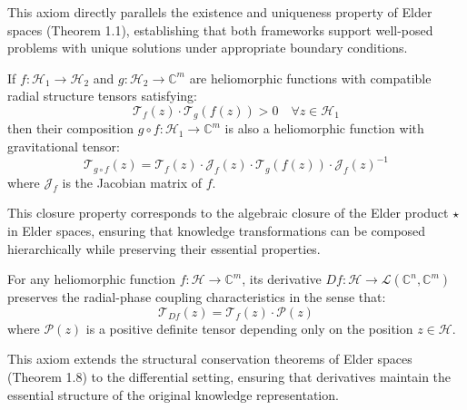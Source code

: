 \begin{remark}
This axiom directly parallels the existence and uniqueness property of Elder spaces (Theorem 1.1), establishing that both frameworks support well-posed problems with unique solutions under appropriate boundary conditions.
\end{remark}

\begin{axiom}
If $f: \mathcal{H}_1 \rightarrow \mathcal{H}_2$ and $g: \mathcal{H}_2 \rightarrow \mathbb{C}^m$ are heliomorphic functions with compatible radial structure tensors satisfying:
\begin{equation}
\mathcal{T}_f(z) \cdot \mathcal{T}_g(f(z)) > 0 \quad \forall z \in \mathcal{H}_1
\end{equation}
then their composition $g \circ f: \mathcal{H}_1 \rightarrow \mathbb{C}^m$ is also a heliomorphic function with gravitational tensor:
\begin{equation}
\mathcal{T}_{g \circ f}(z) = \mathcal{T}_f(z) \cdot \mathcal{J}_f(z) \cdot \mathcal{T}_g(f(z)) \cdot \mathcal{J}_f(z)^{-1}
\end{equation}
where $\mathcal{J}_f$ is the Jacobian matrix of $f$.
\end{axiom}

\begin{remark}
This closure property corresponds to the algebraic closure of the Elder product $\star$ in Elder spaces, ensuring that knowledge transformations can be composed hierarchically while preserving their essential properties.
\end{remark}

\begin{axiom}
For any heliomorphic function $f: \mathcal{H} \rightarrow \mathbb{C}^m$, its derivative $Df: \mathcal{H} \rightarrow \mathcal{L}(\mathbb{C}^n, \mathbb{C}^m)$ preserves the radial-phase coupling characteristics in the sense that:
\begin{equation}
\mathcal{T}_{Df}(z) = \mathcal{T}_f(z) \cdot \mathcal{P}(z)
\end{equation}
where $\mathcal{P}(z)$ is a positive definite tensor depending only on the position $z \in \mathcal{H}$.
\end{axiom}

\begin{remark}
This axiom extends the structural conservation theorems of Elder spaces (Theorem 1.8) to the differential setting, ensuring that derivatives maintain the essential structure of the original knowledge representation.
\end{remark}

